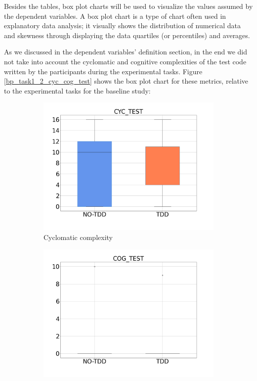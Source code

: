Besides the tables, box plot charts will be used to visualize the values assumed by the dependent variables.
A box plot chart is a type of chart often used in explanatory data analysis; it visually shows the distribution of numerical data and skewness through displaying the data quartiles (or percentiles) and averages.

As we discussed in the dependent variables' definition section, in the end we did not take into account the cyclomatic and cognitive complexities of the test code written by the participants during the experimental tasks. 
Figure \ref{bp_task1_2_cyc_cog_test} shows the box plot chart for these metrics, relative to the experimental tasks for the baseline study:

\begin{figure}[htbp]
    \begin{subfigure}{0.5\textwidth}
        \includegraphics[width=\linewidth]{figures/box_plots/CYC_TEST.png}
        \caption{Cyclomatic complexity }
        \label{bp_task1_2_cyc_test}
    \end{subfigure}\hfil
    \begin{subfigure}{0.5\textwidth}
        \includegraphics[width=\linewidth]{figures/box_plots/COG_TEST.png}

\end{subfigure}
\end{figure}

